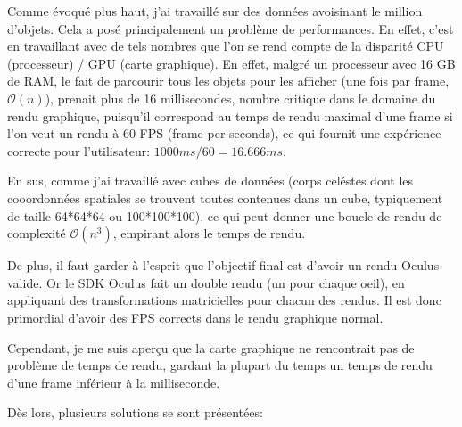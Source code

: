 \documentclass[a4paper,french,12pt]{article}
\begin{document}
		  Comme évoqué plus haut, j'ai travaillé sur des données avoisinant le million d'objets. Cela a posé
		  principalement un problème de performances. En effet, c'est en travaillant avec de tels nombres que
		  l'on se rend compte de la disparité CPU (processeur) / GPU (carte graphique).
		  En effet, malgré un processeur avec 16 GB de RAM, le fait de parcourir tous les objets pour les afficher (une fois par frame, $\mathcal{O}(n)$),
		  prenait plus de 16 millisecondes, nombre critique dans le domaine du rendu graphique, puisqu'il
		  correspond au temps de rendu maximal d'une frame si l'on veut un rendu à 60 FPS (frame per seconds),
		  ce qui fournit une expérience correcte pour l'utilisateur: $1000 ms / 60 = 16.666 ms$.
		  
		  En sus, comme j'ai travaillé avec cubes de données (corps celéstes dont les cooordonnées spatiales se trouvent toutes
		  contenues dans un cube, typiquement de taille 64*64*64 ou 100*100*100), ce qui peut donner une boucle de rendu
		  de complexité $\mathcal{O}(n^3)$, empirant alors le temps de rendu.
		  
		  De plus, il faut garder à l'esprit que l'objectif final est d'avoir un rendu Oculus valide. Or le
		  SDK Oculus fait un double rendu (un pour chaque oeil), en appliquant des transformations matricielles
		  pour chacun des rendus. Il est donc primordial d'avoir des FPS corrects dans le rendu graphique normal.
		  
		  Cependant, je me suis aperçu que la carte graphique ne rencontrait pas de problème de temps de rendu,
		  gardant la plupart du temps un temps de rendu d'une frame inférieur à la milliseconde.
		  
		  Dès lors, plusieurs solutions se sont présentées:
		  
\end{document}
